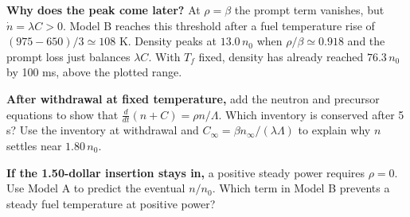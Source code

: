 \documentclass[compact]{ne630handout}
\begin{document}
\textbf{Why does the peak come later?} At $\rho=\beta$ the prompt term vanishes, but $\dot n=\lambda C>0$.
Model B reaches this threshold after a fuel temperature rise of $(975-650)/3\simeq108$ K. Density peaks at $13.0\,n_0$ when $\rho/\beta\simeq0.918$ and the prompt loss just balances $\lambda C$. With $T_f$ fixed, density has already reached $76.3\,n_0$ by 100 ms, above the plotted range.

\begin{checkpoint}
\textbf{After withdrawal at fixed temperature,} add the neutron and precursor equations to show that
$\frac{d}{dt}(n+C)=\rho n/\Lambda$. Which inventory is conserved after 5 s? Use the inventory at withdrawal and $C_\infty=\beta n_\infty/(\lambda\Lambda)$ to explain why $n$ settles near $1.80\,n_0$.

\smallskip
\textbf{If the 1.50-dollar insertion stays in,} a positive steady power requires $\rho=0$. Use Model A to predict the eventual $n/n_0$. Which term in Model B prevents a steady fuel temperature at positive power?
\end{checkpoint}
\end{document}
